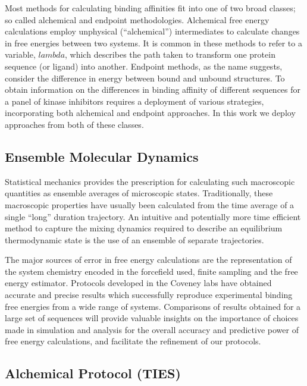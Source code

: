 \documentclass[conference]{IEEEtran}
\begin{document}
Most methods for calculating binding affinities fit into one of two broad classes; so called alchemical and endpoint methodologies. Alchemical free energy calculations employ unphysical (“alchemical”) intermediates to calculate changes in free energies between two systems. It is common in these methods to refer to a variable, $lambda$, which describes the path taken to transform one protein sequence (or ligand) into another. Endpoint methods, as the name suggests, consider the difference in energy between bound and unbound structures. To obtain information on the differences in binding affinity of different sequences for a panel of kinase inhibitors requires a deployment of various strategies, incorporating both alchemical and endpoint approaches. In this work we deploy approaches from both of these classes.


\subsection{Ensemble Molecular Dynamics}\label{sec:emd}

Statistical mechanics provides the prescription for calculating such macroscopic quantities as ensemble averages of microscopic states. Traditionally, these macroscopic properties have usually been calculated from the time average of a single “long” duration trajectory. An intuitive and potentially more time efficient method to capture the mixing dynamics required to describe an equilibrium thermodynamic state is the use of an ensemble of separate trajectories. \cite{Coveney2016}

The major sources of error in free energy calculations are the representation of the system chemistry encoded in the forcefield used, finite sampling and the free energy estimator. Protocols developed in the Coveney labs have obtained accurate and precise results which successfully reproduce experimental binding free energies from a wide range of systems. \cite{Bhati2017, Wright2014, Wan2017brd4, Wan2011, chodera-shirts:jcp:2011:gibbs, Chodera2016} Comparisons of results obtained for a large set of sequences will provide valuable insights on the importance of choices made in simulation and analysis for the overall accuracy and predictive power of free energy calculations, and facilitate the refinement of our protocols. 


\subsection{Alchemical Protocol (TIES)}\label{sec:ties}
\end{document}
